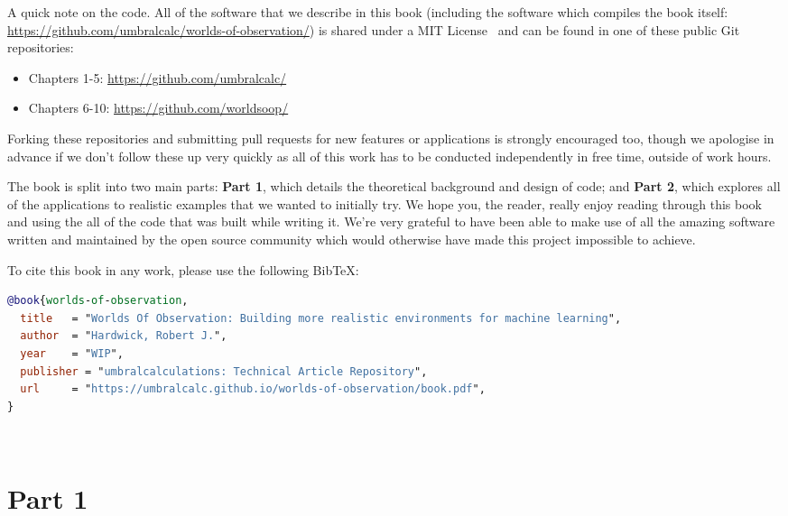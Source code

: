\documentclass{book}
\begin{document}
A quick note on the code. All of the software that we describe in this book (including the software which compiles the book itself: \href{https://github.com/umbralcalc/worlds-of-observation/}{https://github.com/umbralcalc/worlds-of-observation/}) is shared under a MIT License~\cite{mitlicense} and can be found in one of these public Git repositories:
\begin{itemize}
\item{Chapters 1-5: \href{https://github.com/umbralcalc/}{https://github.com/umbralcalc/}}
\item{Chapters 6-10: \href{https://github.com/worldsoop/}{https://github.com/worldsoop/}} 
\end{itemize}
Forking these repositories and submitting pull requests for new features or applications is strongly encouraged too, though we apologise in advance if we don't follow these up very quickly as all of this work has to be conducted independently in free time, outside of work hours.

The book is split into two main parts: {\bfseries\sffamily Part 1}, which details the theoretical background and design of code; and {\bfseries\sffamily Part 2}, which explores all of the applications to realistic examples that we wanted to initially try. We hope you, the reader, really enjoy reading through this book and using the all of the code that was built while writing it. We're very grateful to have been able to make use of all the amazing software written and maintained by the open source community which would otherwise have made this project impossible to achieve.

To cite this book in any work, please use the following BibTeX:
\begin{adjustwidth}{2em}{2em}
\begin{lstlisting}[language=BibTeX,numbers=none]
@book{worlds-of-observation,
  title   = "Worlds Of Observation: Building more realistic environments for machine learning",
  author  = "Hardwick, Robert J.",
  year    = "WIP",
  publisher = "umbralcalculations: Technical Article Repository",
  url     = "https://umbralcalc.github.io/worlds-of-observation/book.pdf",
}
\end{lstlisting}
\end{adjustwidth}

\newpage \ \newpage
{\sffamily \tableofcontents}
\mainmatter

\part*{{\sffamily Part 1}}
\end{document}
